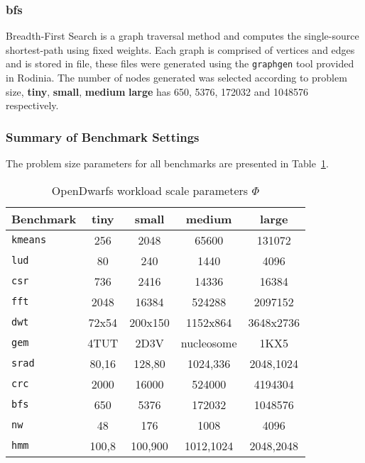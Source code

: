 \documentclass[../document.tex]{subfiles}
\begin{document}
\subsubsection{bfs}
Breadth-First Search is a graph traversal method and computes the single-source shortest-path using fixed weights.
Each graph is comprised of vertices and edges and is stored in file, these files were generated using the {\tt graphgen} tool provided in Rodinia\cite{che2009rodinia}.
The number of nodes generated was selected according to problem size, {\bf tiny}, {\bf small}, {\bf medium} {\bf large} has 650, 5376, 172032 and 1048576 respectively.

\subsubsection{Summary of Benchmark Settings}

The problem size parameters for all benchmarks are presented in Table~\ref{tab:problem_sizes}.

\begin{table}[thb]
	\centering
	\begin{threeparttable}
		\centering
		\caption{OpenDwarfs workload scale parameters $\Phi$}
		\begin{tabular}{l|c|c|c|c}
			\bf Benchmark         & \bf tiny   & \bf small  & \bf medium     & \bf large\\\hline
			{\tt kmeans}          & 256        & 2048   & 65600      & 131072\\
			{\tt lud}             & 80         & 240    & 1440       & 4096\\
			{\tt csr}             & 736        & 2416   & 14336      & 16384\\
			{\tt fft}             & 2048       & 16384  & 524288     & 2097152\\
			{\tt dwt}             & 72x54      & 200x150& 1152x864   & 3648x2736\\       
			{\tt gem}             & 4TUT       & 2D3V   & nucleosome & 1KX5\\
			{\tt srad}            & 80,16      & 128,80 & 1024,336   & 2048,1024\\
			{\tt crc}             & 2000       & 16000  & 524000     & 4194304\\
            {\tt bfs}             & 650        & 5376   & 172032     & 1048576\\
            {\tt nw}              & 48         & 176    & 1008       & 4096\\
            {\tt hmm}             & 100,8      & 100,900& 1012,1024  & 2048,2048\\
		\end{tabular}
		\label{tab:problem_sizes}
	\end{threeparttable}
\end{table}
\end{document}
